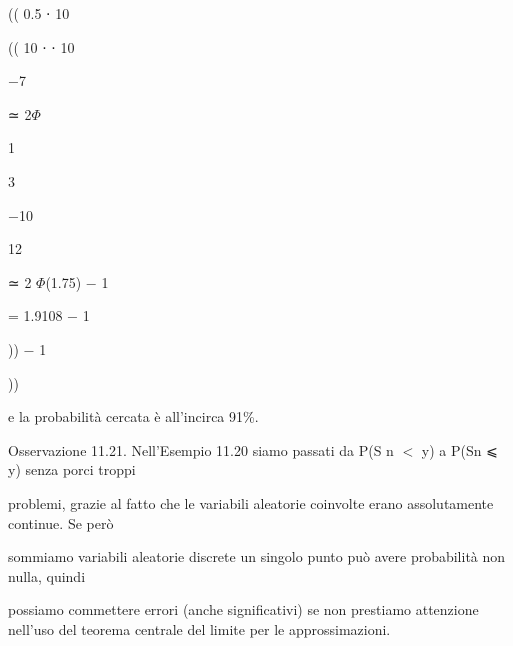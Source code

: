 \documentclass[a4paper,portrait,12pt]{article}
\begin{document}
(( 0.5 ⋅ 10


(( 10 ⋅ ⋅ 10


$-$7





\begin{flushleft}
≃ 2$\Phi$
\end{flushleft}





1





3





$-$10





12





\begin{flushleft}
≃ 2 $\Phi$(1.75) $-$ 1
\end{flushleft}


= 1.9108 $-$ 1





)) $-$ 1


))





\begin{flushleft}
e la probabilit\`{a} cercata \`{e} all'incirca 91\%.
\end{flushleft}


\begin{flushleft}
Osservazione 11.21. Nell'Esempio 11.20 siamo passati da P(S n $<$ y) a P(Sn ⩽ y) senza porci troppi
\end{flushleft}


\begin{flushleft}
problemi, grazie al fatto che le variabili aleatorie coinvolte erano assolutamente continue. Se per\`{o}
\end{flushleft}


\begin{flushleft}
sommiamo variabili aleatorie discrete un singolo punto pu\`{o} avere probabilit\`{a} non nulla, quindi
\end{flushleft}


\begin{flushleft}
possiamo commettere errori (anche significativi) se non prestiamo attenzione nell'uso del teorema centrale del limite per le approssimazioni.
\end{flushleft}
\end{document}

